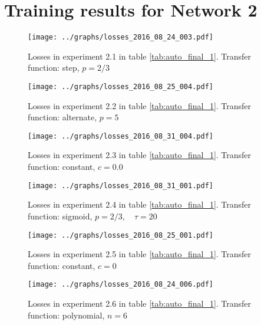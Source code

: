 \appendix
\chapter{Training results for Network 2} \label{appendix2}


      \begin{figure}[!h]
      \centering
      \texttt{[image: ../graphs/losses\_2016\_08\_24\_003.pdf]}
      \caption{Losses in experiment 2.1 in table \ref{tab:auto_final_1}. Transfer function: step, $p=2/3$}
      \label{fig:alternate}
      \end{figure}

      \begin{figure}[!h]
      \centering
      \texttt{[image: ../graphs/losses\_2016\_08\_25\_004.pdf]}
      \caption{Losses in experiment 2.2 in table \ref{tab:auto_final_1}. Transfer function: alternate, $p=5$}
      \label{fig:alternate}
      \end{figure}

      \begin{figure}[!h]
      \centering \texttt{[image: ../graphs/losses\_2016\_08\_31\_004.pdf]}
      \caption{Losses in experiment 2.3 in table \ref{tab:auto_final_1}. Transfer function: constant, $c=0.0$}
      \label{fig:alternate} \end{figure}

      \begin{figure}[!h]
      \centering
      \texttt{[image: ../graphs/losses\_2016\_08\_31\_001.pdf]}
      \caption{Losses in experiment 2.4 in table \ref{tab:auto_final_1}. Transfer function: sigmoid, $p=2/3,\quad \tau=20$}
      \label{fig:alternate}
      \end{figure}

      \begin{figure}[!h]
      \centering
      \texttt{[image: ../graphs/losses\_2016\_08\_25\_001.pdf]}
      \caption{Losses in experiment 2.5 in table \ref{tab:auto_final_1}. Transfer function: constant, $c=0$}
      \label{fig:alternate}
      \end{figure}

      \begin{figure}[!h]
      \centering
      \texttt{[image: ../graphs/losses\_2016\_08\_24\_006.pdf]}
      \caption{Losses in experiment 2.6 in table \ref{tab:auto_final_1}. Transfer function: polynomial, $n=6$}
      \label{fig:alternate}
      \end{figure}
